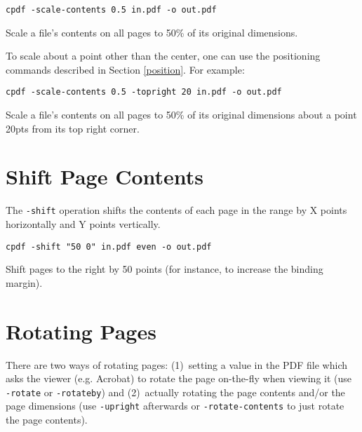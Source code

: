\documentclass{book}
\begin{document}
  \begin{framed}
  \small\noindent\verb!cpdf -scale-contents 0.5 in.pdf -o out.pdf!

  \vspace{2.5mm}
  \noindent Scale a file's contents on all pages to 50\% of its original dimensions.
  \end{framed}

  \noindent To scale about a point other than the center, one can use the positioning commands described in Section \ref{position}. For example:
  
  \begin{framed}
  \small\noindent\verb!cpdf -scale-contents 0.5 -topright 20 in.pdf -o out.pdf!

  \vspace{2.5mm}
  \noindent Scale a file's contents on all pages to 50\% of its original dimensions about a point 20pts from its top right corner.
  \end{framed}

  

  \section{Shift Page Contents}

  The \texttt{-shift} operation shifts the contents of each page in the range
by X points horizontally and Y points vertically.

  \begin{framed}
  \small\noindent\verb!cpdf -shift "50 0" in.pdf even -o out.pdf!

  \vspace{2.5mm}

  \noindent Shift pages to the right by 50 points (for instance, to increase
the binding margin).

  \end{framed}
  \section{Rotating Pages}

There are two ways of rotating pages: (1)~setting a value in the PDF file which
asks the viewer (e.g. Acrobat) to rotate the page on-the-fly when viewing it
(use \texttt{-rotate} or \texttt{-rotateby}) and (2)~actually rotating the page
contents and/or the page dimensions (use \texttt{-upright} afterwards or
\texttt{-rotate-contents} to just rotate the page contents).
\end{document}

